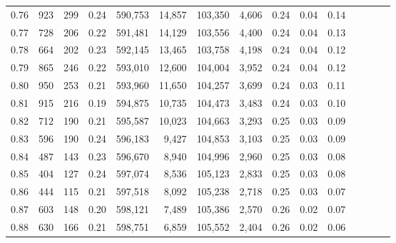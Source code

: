 \begin{tabular}{rrrcrrrrrrrrrrr}
0.76 &     923 &     299 &                                       0.24 &  590,753 &   14,857 &  103,350 &    4,606 &  0.24 &  0.04 &                         0.14 \\
0.77 &     728 &     206 &                                       0.22 &  591,481 &   14,129 &  103,556 &    4,400 &  0.24 &  0.04 &                         0.13 \\
0.78 &     664 &     202 &                                       0.23 &  592,145 &   13,465 &  103,758 &    4,198 &  0.24 &  0.04 &                         0.12 \\
0.79 &     865 &     246 &                                       0.22 &  593,010 &   12,600 &  104,004 &    3,952 &  0.24 &  0.04 &                         0.12 \\
0.80 &     950 &     253 &                                       0.21 &  593,960 &   11,650 &  104,257 &    3,699 &  0.24 &  0.03 &                         0.11 \\
0.81 &     915 &     216 &                                       0.19 &  594,875 &   10,735 &  104,473 &    3,483 &  0.24 &  0.03 &                         0.10 \\
0.82 &     712 &     190 &                                       0.21 &  595,587 &   10,023 &  104,663 &    3,293 &  0.25 &  0.03 &                         0.09 \\
0.83 &     596 &     190 &                                       0.24 &  596,183 &    9,427 &  104,853 &    3,103 &  0.25 &  0.03 &                         0.09 \\
0.84 &     487 &     143 &                                       0.23 &  596,670 &    8,940 &  104,996 &    2,960 &  0.25 &  0.03 &                         0.08 \\
0.85 &     404 &     127 &                                       0.24 &  597,074 &    8,536 &  105,123 &    2,833 &  0.25 &  0.03 &                         0.08 \\
0.86 &     444 &     115 &                                       0.21 &  597,518 &    8,092 &  105,238 &    2,718 &  0.25 &  0.03 &                         0.07 \\
0.87 &     603 &     148 &                                       0.20 &  598,121 &    7,489 &  105,386 &    2,570 &  0.26 &  0.02 &                         0.07 \\
0.88 &     630 &     166 &                                       0.21 &  598,751 &    6,859 &  105,552 &    2,404 &  0.26 &  0.02 &                         0.06 \\

\end{tabular}
